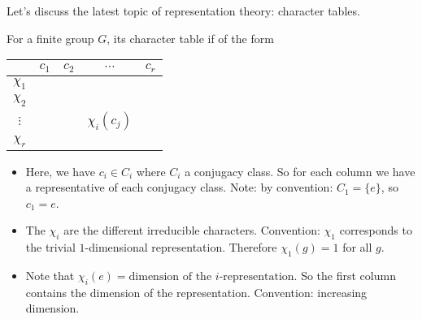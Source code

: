 Let's discuss the latest topic of representation theory: character tables.



For a finite group $G$, its character table if of the form


\begin{tabular}{ccccc}
         & $c_1$ & $ c_2$ & $\cdots$ & $c_r$ \\ \hline
    $\chi_1$ &  & & & \\
    $\chi_2$ &  & & & \\
    $\vdots$ &  & & $\chi_{i} (c_j)$ & \\
    $\chi_r$ &  & & & \\
\end{tabular}

\begin{itemize}
    \item Here, we have $c_i \in  C_i$ where $C_i$ a conjugacy class. So for each column we have a representative of each conjugacy class.
Note: by convention: $C_1 = \{e\}$, so $ c_1 = e$.

\item The $\chi_i$ are the different irreducible characters.
Convention: $\chi_1$ corresponds to the trivial  $1$-dimensional representation. Therefore $\chi_1(g) = 1$ for all $g$.

\item Note that $\chi_{i}(e) = \text{dimension of the $i$-representation}$. So the first column contains the dimension of the representation.
    Convention: increasing dimension.

\end{itemize}

